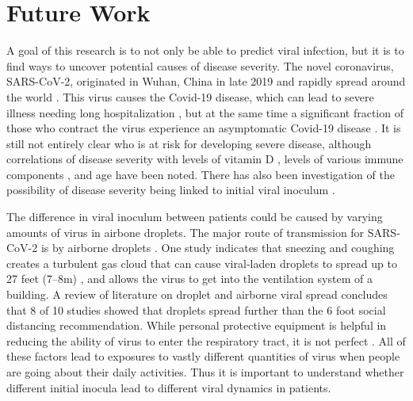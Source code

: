 \section{Future Work}

A goal of this research is to not only be able to predict viral infection, but it is to find ways to uncover potential causes of disease severity. The novel coronavirus, SARS-CoV-2, originated in Wuhan, China in late 2019 and rapidly spread around the world \citep{chen20,wu20}. This virus causes the Covid-19 disease, which can lead to severe illness needing long hospitalization \citep{sun20,goyal20,jiang20}, but at the same time a significant fraction of those who contract the virus experience an asymptomatic Covid-19 disease \citep{he20}. It is still not entirely clear who is at risk for developing severe disease, although correlations of disease severity with levels of vitamin D \citep{ilie20}, levels of various immune components \citep{liu20imm,liu20imm2,zhang20imm,yang20imm}, and age \citep{borghesi20,zhang20imm} have been noted. There has also been investigation of the possibility of disease severity being linked to initial viral inoculum \citep{little20, guallar20, ghandi20}.

The difference in viral inoculum between patients could be caused by varying amounts of virus in airbone droplets. The major route of transmission for SARS-CoV-2 is by airborne droplets \citep{morawska20}. One study indicates that sneezing and coughing creates a turbulent gas cloud that can cause viral-laden droplets to spread up to 27 feet (\numrange[range-phrase = --]{7}{8}\si{\meter}) \citep{bourouiba20}, and allows the virus to get into the ventilation system of a building. A review of literature on droplet and airborne viral spread concludes that 8 of 10 studies showed that droplets spread further than the 6 foot \citep{bahl20} social distancing recommendation. While personal protective equipment is helpful in reducing the ability of virus to enter the respiratory tract, it is not perfect \citep{mittal20}. All of these factors lead to exposures to vastly different quantities of virus when people are going about their daily activities. Thus it is important to understand whether different initial inocula lead to different viral dynamics in patients. 

